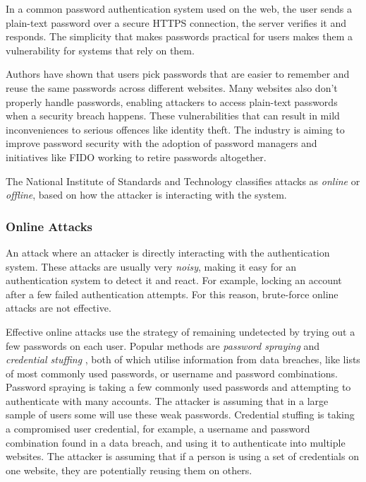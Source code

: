 In a common password authentication system used on the web, the user sends a plain-text password over a secure HTTPS connection, the server verifies it and responds.
The simplicity that makes passwords practical for users makes them a vulnerability for systems that rely on them.

Authors \cite{conklin2004password} have shown that users pick passwords that are easier to remember and reuse the same passwords across different websites.
Many websites also don't properly handle passwords, enabling attackers to access plain-text passwords when a security breach happens.
These vulnerabilities that can result in mild inconveniences to serious offences like identity theft.
The industry is aiming to improve password security with the adoption of password managers and initiatives like FIDO \cite{cho2014passwordless} working to retire passwords altogether.

The National Institute of Standards and Technology \cite{grassi2017} classifies attacks as \textit{online} or \textit{offline}, based on how the attacker is interacting with the system.


\subsubsection{Online Attacks}
An attack where an attacker is directly interacting with the authentication system.
These attacks are usually very \textit{noisy}, making it easy for an authentication system to detect it and react.
For example, locking an account after a few failed authentication attempts.
For this reason, brute-force online attacks are not effective.

Effective online attacks use the strategy of remaining undetected by trying out a few passwords on each user.
Popular methods are \textit{password spraying} and \textit{credential stuffing} \cite{haber2020attack}, both of which utilise information from data breaches, like lists of most commonly used passwords, or username and password combinations.
Password spraying is taking a few commonly used passwords and attempting to authenticate with many accounts. The attacker is assuming that in a large sample of users some will use these weak passwords.
Credential stuffing is taking a compromised user credential, for example, a username and password combination found in a data breach, and using it to authenticate into multiple websites.
The attacker is assuming that if a person is using a set of credentials on one website, they are potentially reusing them on others.

